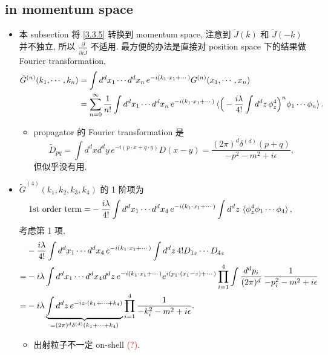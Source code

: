 \subsection{in momentum space} \label{subsection 3.3.2}
\begin{itemize}
	\item 本 subsection 将 \eqref{3.3.5} 转换到 momentum space, 注意到 $\tilde{J}(k)$ 和 $\tilde{J}(- k)$ 并不独立, 所以 $\frac{\partial}{\partial i \tilde{J}}$ 不适用. 最方便的办法是直接对 position space 下的结果做 Fourier transformation,
	\begin{align}
		\tilde{G}^{(n)}(k_1, \cdots, k_n) &= \int d^d x_1 \cdots d^d x_n \, e^{- i (k_1 \cdot x_1 + \cdots)} G^{(n)}(x_1, \cdots, x_n) \notag \\
		&= \sum_{n = 0}^\infty \frac{1}{n!} \int d^d x_1 \cdots d^d x_n \, e^{- i (k_1 \cdot x_1 + \cdots)} \braket{\Big( - \frac{i \lambda}{4!} \int d^d z \, \phi_z^4 \Big)^n \phi_1 \cdots \phi_n}.
	\end{align}
	\begin{itemize}
		\item propagator 的 Fourier transformation 是
		\begin{equation}
			\tilde{D}_{p q} = \int d^d x d^d y \, e^{- i (p \cdot x + q \cdot y)} D(x - y) = \frac{(2 \pi)^d \delta^{(d)}(p + q)}{- p^2 - m^2 + i \epsilon},
		\end{equation}
		但似乎没有用.
	\end{itemize}
	
	\item $\tilde{G}^{(4)}(k_1, k_2, k_3, k_4)$ 的 1 阶项为
	\begin{align}
		\text{1st order term} =& - \frac{i \lambda}{4!} \int d^d x_1 \cdots d^d x_4 \, e^{- i (k_1 \cdot x_1 + \cdots)} \int d^d z \, \braket{\phi_z^4 \phi_1 \cdots \phi_4},
	\end{align}
	考虑第 1 项,
	\begin{align}
		& - \frac{i \lambda}{4!} \int d^d x_1 \cdots d^d x_4 \, e^{- i (k_1 \cdot x_1 + \cdots)} \int d^d z \, 4! D_{1 z} \cdots D_{4 z} \notag \\
		=& - i \lambda \int d^d x_1 \cdots d^d x_4 d^d z \, e^{- i (k_1 \cdot x_1 + \cdots)} e^{i (p_1 \cdot (x_1 - z) + \cdots)} \prod_{i = 1}^4 \int \frac{d^d p_i}{(2 \pi)^d} \, \frac{1}{- p_i^2 - m^2 + i \epsilon} \notag \\
		=& - i \lambda \underbrace{\int d^d z \, e^{- i z \cdot (k_1 + \cdots + k_4)}}_{= (2 \pi)^d \delta^{(d)}(k_1 + \cdots + k_4)} \prod_{i = 1}^4 \frac{1}{- k_i^2 - m^2 + i \epsilon}.
	\end{align}
	\begin{itemize}
		\item 出射粒子不一定 on-shell \textcolor{red}{(?)}.
	\end{itemize}
	

\end{itemize}
